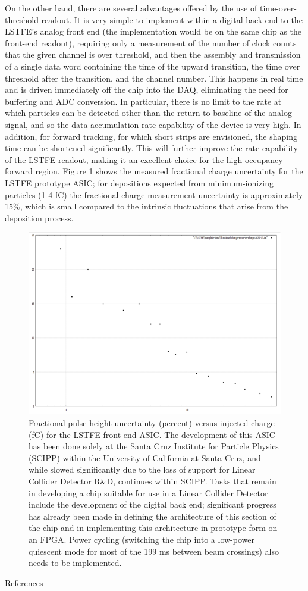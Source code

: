 On the other hand, there are several advantages offered by the use of time-over-threshold readout. It is very simple to implement within a digital back-end to the LSTFE's analog front end (the implementation would be on the same chip as the front-end readout), requiring only a measurement of the number of clock counts that the given channel is over threshold, and then the assembly and transmission of a single data word containing the time of the upward transition, the time over threshold after the transition, and the channel number. This happens in real time and is driven immediately off the chip into the DAQ, eliminating the need for buffering and ADC conversion. In particular, there is no limit to the rate at which particles can be detected other than the return-to-baseline of the analog signal, and so the data-accumulation rate capability of the device is very high. In addition, for forward tracking, for which short strips are envisioned, the shaping time can be shortened significantly. This will further improve the rate capability of the LSTFE readout, making it an excellent choice for the high-occupancy forward region.
Figure 1 shows the measured fractional charge uncertainty for the LSTFE prototype ASIC; for depositions expected from minimum-ionizing particles (1-4 fC) the fractional charge measurement uncertainty is approximately 15\%, which is small compared to the intrinsic fluctuations that arise from the deposition process.
\begin{figure}
\includegraphics{Tracker/SCIPPTracking/SCIPPTracking}
\caption{Fractional pulse-height uncertainty (percent) versus injected charge (fC) for the LSTFE front-end ASIC.
The development of this ASIC has been done solely at the Santa Cruz Institute for Particle Physics (SCIPP) within the University of California at Santa Cruz, and while slowed significantly due to the loss of support for Linear Collider Detector R\&D, continues within SCIPP. Tasks that remain in developing a chip suitable for use in a Linear Collider Detector include the development of the digital back end; significant progress has already been made in defining the architecture of this section of the chip and in implementing this architecture in prototype form on an FPGA. Power cycling (switching the chip into a low-power quiescent mode for most of the 199 ms between beam crossings) also needs to be implemented.}
\end{figure}


References

